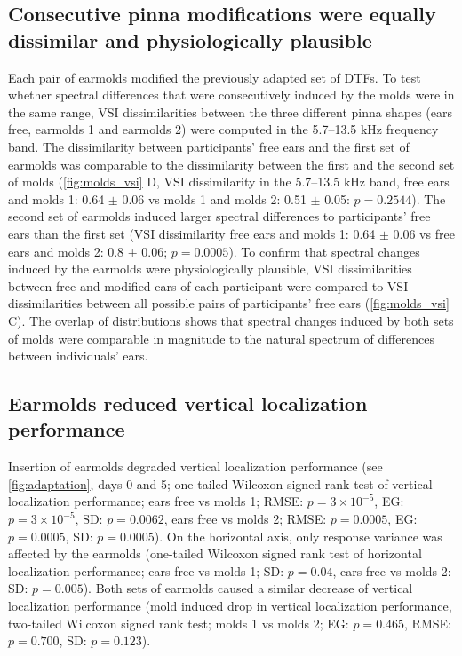 \subsection{Consecutive pinna modifications were equally dissimilar and physiologically plausible}

Each pair of earmolds modified the previously adapted set of DTFs. To test whether spectral differences that were consecutively induced by the molds were in the same range, VSI dissimilarities between the three different pinna shapes (ears free, earmolds 1 and earmolds 2) were computed in the 5.7–13.5 kHz frequency band. The dissimilarity between participants' free ears and the first set of earmolds was comparable to the dissimilarity between the first and the second set of molds (\cref{fig:molds_vsi} D, VSI dissimilarity in the 5.7–13.5 kHz band, free ears and molds 1:  0.64 $\pm$ 0.06 vs molds 1 and molds 2:  0.51 $\pm$ 0.05: $p = 0.2544$). The second set of earmolds induced larger spectral differences to participants' free ears than the first set (VSI dissimilarity free ears and molds 1:  0.64 $\pm$ 0.06 vs free ears and molds 2: 0.8 $\pm$ 0.06; $p = 0.0005$). To confirm that spectral changes induced by the earmolds were physiologically plausible, VSI dissimilarities between free and modified ears of each participant were compared to VSI dissimilarities between all possible pairs of participants’ free ears (\cref{fig:molds_vsi} C). The overlap of distributions shows that spectral changes induced by both sets of molds were comparable in magnitude to the natural spectrum of differences between individuals’ ears.

\subsection{Earmolds reduced vertical localization performance}

Insertion of earmolds degraded vertical localization performance (see \cref{fig:adaptation}, days 0 and 5; one-tailed Wilcoxon signed rank test of vertical localization performance; ears free vs molds 1; RMSE: $p = 3  \times 10^{-5}$, EG: $p = 3 \times 10^{-5}$, SD: $p = 0.0062$, ears free vs molds 2; RMSE: $p = 0.0005$, EG: $p = 0.0005$, SD: $p = 0.0005$). On the horizontal axis, only response variance was affected by the earmolds (one-tailed Wilcoxon signed rank test of horizontal localization performance; ears free vs molds 1; SD: $p = 0.04$, ears free vs molds 2: SD: $p = 0.005$). Both sets of earmolds caused a similar decrease of vertical localization performance (mold induced drop in vertical localization performance, two-tailed Wilcoxon signed rank test; molds 1 vs molds 2; EG: $p = 0.465$, RMSE: $p = 0.700$, SD: $p = 0.123$).

